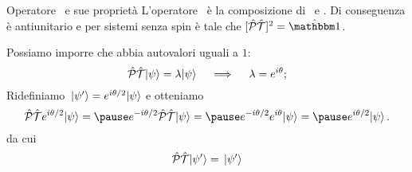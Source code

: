 \begin{frame}{Operatore \hPT\ e sue proprietà}
    L'operatore \hPT\ è la composizione di \hP\ e \hT. Di conseguenza è antiunitario e per sistemi senza spin è tale che $\bqty*{\hPT}\!^2 = \hidM$.

    \pause
    Possiamo imporre che abbia autovalori uguali a $1$:
    $$
        \mathcal{\hat{P}}\mathcal{\hat{T}}\!\ket{\psi} = \lambda\!\ket{\psi}
        \quad\implies\quad
        \lambda = e^{i\theta}
        \text{;}
    $$
    Ridefiniamo $\ket*{\psi'} = e^{i\theta/2}\!\ket{\psi}$ e otteniamo
    $$
        \hPT e^{i\theta/2}\!\ket{\psi}
        =\pause e^{-i\theta/2}\hPT\!\ket{\psi}
        =\pause e^{-i\theta/2}e^{i\theta}\!\ket{\psi}
        =\pause e^{i\theta/2}\!\ket{\psi}
        \myperiod
    $$
    \pause
    da cui $$\mathcal{\hat{P}}\mathcal{\hat{T}}\!\ket*{\psi'} = \ket*{\psi'}$$
\end{frame}